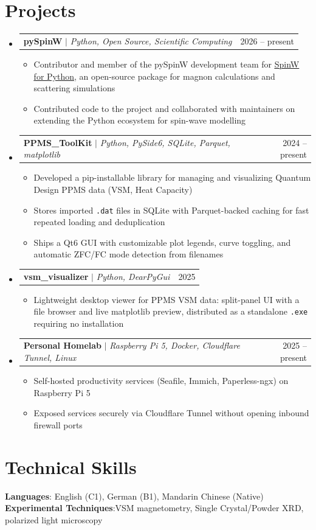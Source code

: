 \documentclass[letterpaper,11pt]{article}
\makeatletter
\newcommand{\resumeItem}[1]{
  \item\small{
    {#1 \vspace{-2pt}}
  }
}
\newcommand{\resumeProjectHeading}[2]{
    \item
    \begin{tabular*}{0.97\textwidth}{l@{\extracolsep{\fill}}r}
      \small#1 & #2 \\
    \end{tabular*}\vspace{-7pt}
}
\newcommand{\resumeSubHeadingListStart}{\begin{itemize}[leftmargin=0.15in, label={}]}
\newcommand{\resumeSubHeadingListEnd}{\end{itemize}}
\newcommand{\resumeItemListStart}{\begin{itemize}}
\newcommand{\resumeItemListEnd}{\end{itemize}\vspace{-5pt}}
\makeatother
\begin{document}
\section{Projects}
    \resumeSubHeadingListStart
      \resumeProjectHeading
          {\textbf{pySpinW} $|$ \emph{Python, Open Source, Scientific Computing}}{2026 -- present}
          \resumeItemListStart
            \resumeItem{Contributor and member of the pySpinW development team for \href{https://github.com/SpinW/pySpinW}{\underline{SpinW for Python}}, an open-source package for magnon calculations and scattering simulations}
            \resumeItem{Contributed code to the project and collaborated with maintainers on extending the Python ecosystem for spin-wave modelling}
          \resumeItemListEnd
      \resumeProjectHeading
          {\textbf{PPMS\_ToolKit} $|$ \emph{Python, PySide6, SQLite, Parquet, matplotlib}}{2024 -- present}
          \resumeItemListStart
            \resumeItem{Developed a pip-installable library for managing and visualizing Quantum Design PPMS data (VSM, Heat Capacity)}
            \resumeItem{Stores imported \texttt{.dat} files in SQLite with Parquet-backed caching for fast repeated loading and deduplication}
            \resumeItem{Ships a Qt6 GUI with customizable plot legends, curve toggling, and automatic ZFC/FC mode detection from filenames}
          \resumeItemListEnd
      \resumeProjectHeading
          {\textbf{vsm\_visualizer} $|$ \emph{Python, DearPyGui}}{2025}
          \resumeItemListStart
            \resumeItem{Lightweight desktop viewer for PPMS VSM data: split-panel UI with a file browser and live matplotlib preview, distributed as a standalone \texttt{.exe} requiring no installation}
          \resumeItemListEnd
      \resumeProjectHeading
          {\textbf{Personal Homelab} $|$ \emph{Raspberry Pi 5, Docker, Cloudflare Tunnel, Linux}}{2025 -- present}
          \resumeItemListStart
            \resumeItem{Self-hosted productivity services (Seafile, Immich, Paperless-ngx) on Raspberry Pi 5}
            \resumeItem{Exposed services securely via Cloudflare Tunnel without opening inbound firewall ports}
          \resumeItemListEnd
    \resumeSubHeadingListEnd


\section{Technical Skills}
 \begin{itemize}[leftmargin=0.15in, label={}]
    \small{\item{
     \textbf{Languages}{: English (C1), German (B1), Mandarin Chinese (Native)} \\
     \textbf{Experimental Techniques}{:VSM magnetometry, Single Crystal/Powder XRD, polarized light microscopy}
    }}
 \end{itemize}
\end{document}
